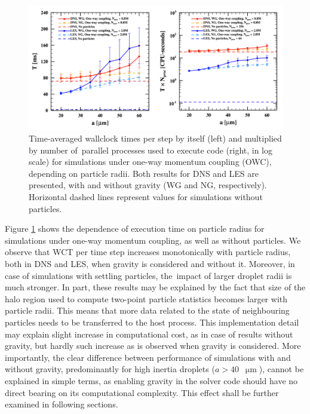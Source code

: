 \documentclass{pracamgren}
\begin{document}
\begin{figure}[h]
\centering
\includegraphics[width=13.5cm]{img/plots/3-2a-pfsowc.pdf}
\caption{
Time-averaged wallclock times per step by itself (left) and multiplied by number of~parallel processes used to execute code (right, in log scale) for simulations under one-way momentum coupling (OWC), depending on particle radii. Both results for DNS and LES are presented, with and without gravity (WG and NG, respectively). Horizontal dashed lines represent values for simulations without particles.
}
\label{fig:pfsowc}
\end{figure}

Figure \ref{fig:pfsowc} shows the dependence of execution time on particle radius for simulations under one-way momentum coupling, as well as without particles.
We observe that WCT per time step increases monotonically with particle radius, both in DNS and LES, when gravity is considered and without it.
Moreover, in case of simulations with settling particles, the~impact of larger droplet radii is much stronger.
In part, these results may be explained by the fact that size of the halo region used to compute two-point particle statistics becomes larger with particle radii.
This means that more data related to the state of neighbouring particles needs to be transferred to the host process.
This implementation detail may explain slight increase in computational cost, as in case of results without gravity, but hardly such increase as is observed when gravity is considered.
More importantly, the clear difference between performance of simulations with and without gravity, predominantly for high inertia droplets ($a > 40$~$\upmu\text{m}$), cannot be explained in simple terms, as enabling gravity in the solver code should have no direct bearing on its computational complexity.
This effect shall be further examined in following sections.
\end{document}
